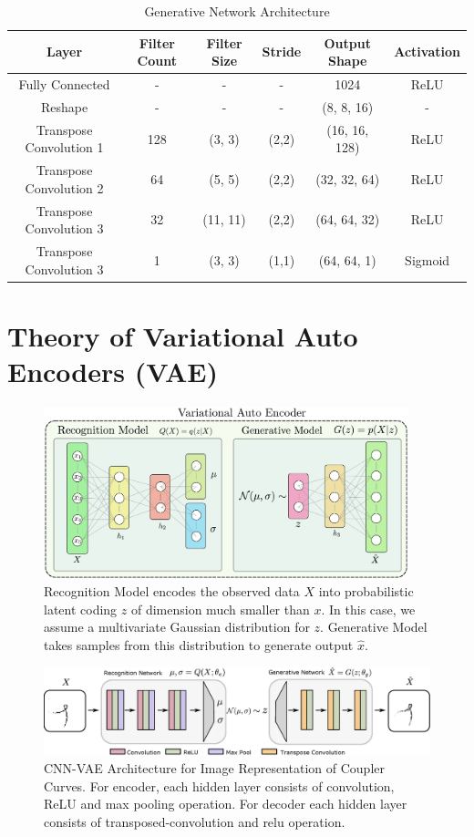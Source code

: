 \begin{table}
  \caption{Generative Network Architecture}
\centering
\label{tab_decoder_paras}
\begin{tabular}{cccccc}
\hline
  Layer & Filter Count & Filter Size & Stride & Output Shape & Activation\\
\hline
  Fully Connected & - & - & - & 1024 & ReLU \\
  Reshape & - & - & - & (8, 8, 16) & - \\
  Transpose Convolution 1 & 128 & (3, 3) & (2,2) & (16, 16, 128) & ReLU   \\
  Transpose Convolution 2 & 64 & (5, 5) & (2,2) & (32, 32, 64) & ReLU   \\
  Transpose Convolution 3 & 32 & (11, 11) & (2,2) & (64, 64, 32) & ReLU   \\
  Transpose Convolution 3 & 1 & (3, 3) & (1,1) & (64, 64, 1) & Sigmoid   \\
\hline
\end{tabular}
\end{table}


\section{Theory of Variational Auto Encoders (VAE)}\label{sec_theory}
\begin{figure}
\centering
\includegraphics[width=300pt]{jmd-19/figure/fig_vae.eps}
  \caption{Recognition Model encodes the observed data $X$ into probabilistic latent coding $z$ of dimension much smaller than $x$. In this case, we assume a multivariate Gaussian distribution for $z$. Generative Model takes samples from this distribution to generate output $\hat{x}$.}
\label{vae_arch}
\end{figure}

\begin{figure}
\centering
\includegraphics[width=\textwidth]{idetc-20/figure/fig_conv_vae.eps}
  \caption{CNN-VAE Architecture for Image Representation of Coupler Curves. For encoder, each hidden layer consists of convolution, ReLU and max pooling operation. For decoder each hidden layer consists of transposed-convolution and relu operation.}
\label{fig_conv_vae}
\end{figure}

